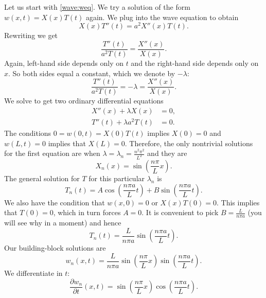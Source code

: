 Let us start with \eqref{wave:weq}.
We try a solution of the form $w(x,t) = X(x) T(t)$ again.  We plug into
the wave equation to obtain
\begin{equation*}
X(x)T''(t) = a^2 X''(x) T(t) .
\end{equation*}
Rewriting we get
\begin{equation*}
\frac{T''(t)}{a^2 T(t)} = \frac{X''(x)}{X(x)} .
\end{equation*}
Again, left-hand side depends only on $t$ and the right-hand side depends
only on $x$.  So both sides equal a constant, which we denote by
$-\lambda$:
\begin{equation*}
\frac{T''(t)}{a^2 T(t)} = -\lambda = \frac{X''(x)}{X(x)} .
\end{equation*}
We solve to get two ordinary differential equations
\begin{align*}
X''(x) + \lambda X(x) &= 0 , \\
T''(t) + \lambda a^2 T(t) &= 0 .
\end{align*}
The conditions $0 = w(0,t) = X(0) T(t)$ implies $X(0) = 0$ and
$w(L,t) = 0$ implies that $X(L) = 0$.  Therefore, the only nontrivial
solutions for the first equation are when
$\lambda = \lambda_n = \frac{n^2 \pi^2}{L^2}$ and they are
\begin{equation*}
X_n(x) = \sin \left( \frac{n \pi}{L} x \right) .
\end{equation*}
The general solution for $T$ for this particular $\lambda_n$ is
\begin{equation*}
T_n(t) = A \cos \left( \frac{n \pi a}{L} t \right)
+ B \sin \left( \frac{n \pi a}{L} t \right).
\end{equation*}
We also have the condition that $w(x,0) = 0$ or $X(x)T(0) = 0$.  This
implies that $T(0) = 0$, which in turn forces $A = 0$.  It is
convenient to pick $B=\frac{L}{n \pi a}$ (you will see why in a moment)
and hence
\begin{equation*}
T_n(t) = \frac{L}{n \pi a} \sin \left( \frac{n \pi a}{L} t \right).
\end{equation*}
Our building-block solutions are
\begin{equation*}
w_n(x,t) = 
\frac{L}{n \pi a} 
\sin \left( \frac{n \pi}{L} x \right)
\sin \left( \frac{n \pi a}{L} t \right) .
\end{equation*}
We differentiate in $t$:
\begin{equation*}
\frac{\partial w_n}{\partial t}(x,t) = 
\sin \left( \frac{n \pi}{L} x \right)
\cos \left( \frac{n \pi a}{L} t \right) .
\end{equation*}
